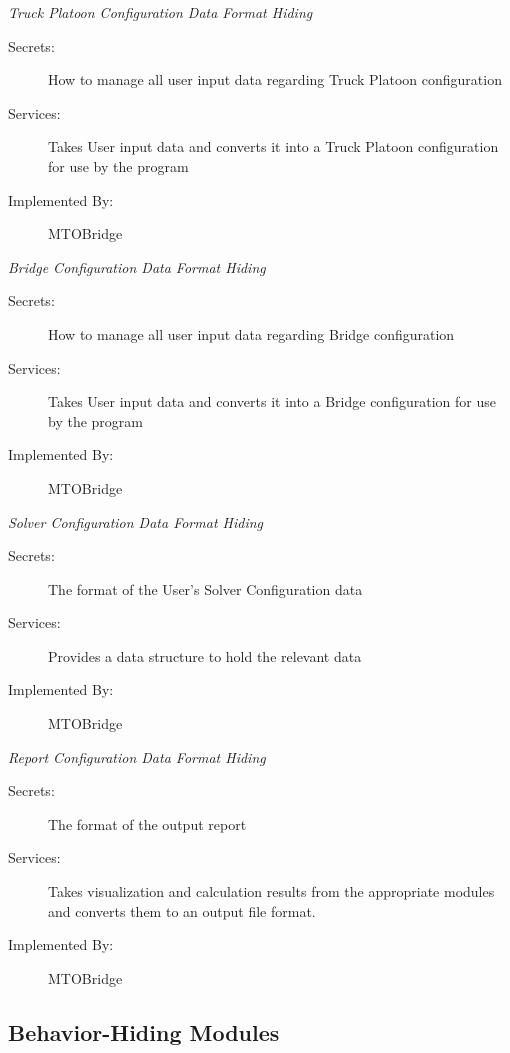 \documentclass[12pt, titlepage]{article}
\begin{document}
     \hypertarget{TPCDFH}{\emph{{\large Truck Platoon Configuration Data Format Hiding}}}
    \begin{description}
        \item[Secrets:]How to manage all user input data regarding Truck Platoon configuration
        \item[Services:]Takes User input data and converts it into a Truck Platoon configuration for use by the program
        \item[Implemented By:] MTOBridge\\
    \end{description}
     \hypertarget{BCDFH}{\emph{{\large Bridge Configuration Data Format Hiding}}}
    \begin{description}
        \item[Secrets:]How to manage all user input data regarding Bridge configuration
        \item[Services:]Takes User input data and converts it into a Bridge configuration for use by the program
        \item[Implemented By:] MTOBridge\\
    \end{description}
     \hypertarget{SCDFH}{\emph{{\large Solver Configuration Data Format Hiding}}}
    \begin{description}
        \item[Secrets:]The format of the User's Solver Configuration data
        \item[Services:]Provides a data structure to hold the relevant data
        \item[Implemented By:] MTOBridge\\
    \end{description}
     \hypertarget{SCDFH}{\emph{{\large Report Configuration Data Format Hiding}}}
    \begin{description}
        \item[Secrets:]The format of the output report
        \item[Services:]Takes visualization and calculation results from the appropriate modules and converts them to an output file format.
        \item[Implemented By:] MTOBridge\\
    \end{description}

\subsection{Behavior-Hiding Modules}
\end{document}
